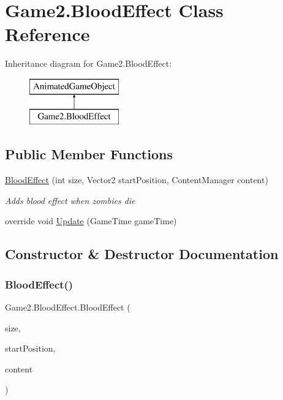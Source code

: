 \hypertarget{class_game2_1_1_blood_effect}{}\section{Game2.\+Blood\+Effect Class Reference}
\label{class_game2_1_1_blood_effect}
Inheritance diagram for Game2.\+Blood\+Effect\+:\begin{figure}[H]
\begin{center}
\leavevmode
\includegraphics[height=2.000000cm]{class_game2_1_1_blood_effect}
\end{center}
\end{figure}
\subsection*{Public Member Functions}
\begin{DoxyCompactItemize}
\item 
\mbox{\hyperlink{class_game2_1_1_blood_effect_a3d2f1095d0fecc3e822a67128b0bdc46}{Blood\+Effect}} (int size, Vector2 start\+Position, Content\+Manager content)
\begin{DoxyCompactList}\small\item\em Adds blood effect when zombies die \end{DoxyCompactList}\item 
override void \mbox{\hyperlink{class_game2_1_1_blood_effect_a8cde53e26db5632859fb90f87b1dc543}{Update}} (Game\+Time game\+Time)
\end{DoxyCompactItemize}


\subsection{Constructor \& Destructor Documentation}
\mbox{\label{class_game2_1_1_blood_effect_a3d2f1095d0fecc3e822a67128b0bdc46}} 
\subsubsection{\texorpdfstring{Blood\+Effect()}{BloodEffect()}}
{\footnotesize\ttfamily Game2.\+Blood\+Effect.\+Blood\+Effect (\begin{DoxyParamCaption}\item[{int}]{size,  }\item[{Vector2}]{start\+Position,  }\item[{Content\+Manager}]{content }\end{DoxyParamCaption})}



